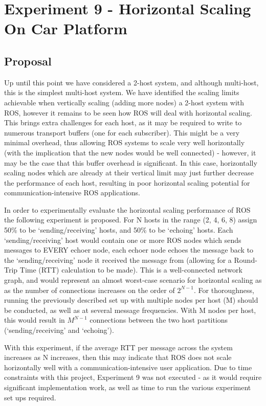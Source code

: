\documentclass[../dissertation.tex]{subfiles}
\begin{document}
\section{Experiment 9 - Horizontal Scaling On Car Platform}
\label{experiment9-horizontal-scaling}

\subsection{Proposal}

Up until this point we have considered a 2-host system, and although multi-host, this is the simplest multi-host system. We have identified the scaling limits achievable when vertically scaling (adding more nodes) a 2-host system with ROS, however it remains to be seen how ROS will deal with horizontal scaling. This brings extra challenges for each host, as it may be required to write to numerous transport buffers (one for each subscriber). This might be a very minimal overhead, thus allowing ROS systems to scale very well horizontally (with the implication that the new nodes would be well connected) - however, it may be the case that this buffer overhead is significant. In this case, horizontally scaling nodes which are already at their vertical limit may just further decrease the performance of each host, resulting in poor horizontal scaling potential for communication-intensive ROS applications.

In order to experimentally evaluate the horizontal scaling performance of ROS the following experiment is proposed. For N hosts in the range (2, 4, 6, 8) assign 50\% to be `sending/receiving' hosts, and 50\% to be `echoing' hosts. Each `sending/receiving' host would contain one or more ROS nodes which sends messages to EVERY echoer node, each echoer node echoes the message back to the `sending/receiving' node it received the message from (allowing for a Round-Trip Time (RTT) calculation to be made). This is a well-connected network graph, and would represent an almost worst-case scenario for horizontal scaling as as the number of connections increases on the order of $2^{N-1}$. For thoroughness, running the previously described set up with multiple nodes per host (M) should be conducted, as well as at several message frequencies. With M nodes per host, this would result in $M^{N-1}$ connections between the two host partitions (`sending/receiving' and `echoing').

With this experiment, if the average RTT per message across the system increases as N increases, then this may indicate that ROS does not scale horizontally well with a communication-intensive user application. Due to time constraints with this project, Experiment 9 was not executed - as it would require significant implementation work, as well as time to run the various experiment set ups required.
\end{document}
